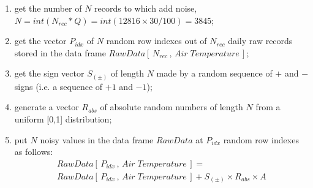 \documentclass[authoryear,preprint,review,12pt]{elsarticle}
\begin{document}
\begin{enumerate}
    \item get the number of $N$ records to which add noise, $N = int( N_{rec} * Q ) = int(12816 \times 30 / 100) = 3845$;
    \item get the vector $P_{idx}$ of $N$ random row indexes out of $N_{rec}$ daily raw records stored in the data frame $RawData[\,N_{rec}\,,\,Air \; Temperature\,]$;
    \item get the sign vector $S_{(\pm)}$ of length $N$ made by a random sequence of $+$ and $-$ signs (i.e. a sequence of $+1$ and $-1$);
    \item generate a vector $R_{abs}$ of absolute random numbers of length $N$ from a uniform [0,1] distribution;
    \item put $N$ noisy values in the data frame $RawData$ at $P_{idx}$ random row indexes as follows:
    \begin{multline}
    RawData[\,P_{idx}\,,\,Air \; Temperature\,] = \\
    RawData[\,P_{idx}\,,\,Air \; Temperature\,] + S_{(\pm)} \times R_{abs} \times A      
    \end{multline}
\end{enumerate}

\end{document}
